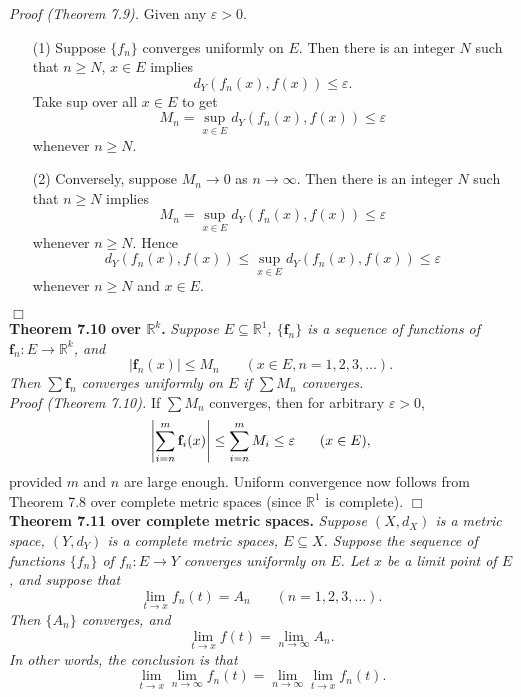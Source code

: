 \documentclass{article}
\begin{document}
\emph{Proof (Theorem 7.9).}
Given any $\varepsilon > 0$.
\begin{enumerate}
  \item[(1)]
  Suppose $\{f_n\}$ converges uniformly on $E$.
  Then there is an integer $N$ such that $n \geq N$, $x \in E$ implies
  \[
    d_Y(f_n(x),f(x)) \leq \varepsilon.
  \]
  Take sup over all $x \in E$ to get
  \[
    M_n = \sup_{x \in E} d_Y(f_n(x),f(x)) \leq \varepsilon
  \]
  whenever $n \geq N$.

  \item[(2)]
  Conversely, suppose $M_n \to 0$ as $n \to \infty$.
  Then there is an integer $N$ such that $n \geq N$ implies
  \[
    M_n = \sup_{x \in E} d_Y(f_n(x),f(x)) \leq \varepsilon
  \]
  whenever $n \geq N$.
  Hence
  \[
    d_Y(f_n(x),f(x)) \leq \sup_{x \in E} d_Y(f_n(x),f(x)) \leq \varepsilon
  \]
  whenever $n \geq N$ and $x \in E$.
\end{enumerate}
$\Box$ \\



\textbf{Theorem 7.10 over $\mathbb{R}^k$.}
\emph{Suppose $E \subseteq \mathbb{R}^1$,
$\{\mathbf{f}_n\}$ is a sequence of functions of $\mathbf{f}_n: E \to \mathbb{R}^k$,
and
\[
  |\mathbf{f}_n(x)| \leq M_n
  \:\:\:\:\:\:\:\:
  (x \in E, n = 1,2,3,\ldots).
\]
Then $\sum \mathbf{f}_n$ converges uniformly on $E$ if $\sum M_n$ converges.} \\

\emph{Proof (Theorem 7.10).}
If $\sum M_n$ converges, then for arbitrary $\varepsilon > 0$,
\[
  \abs{\sum_{i=n}^{m}\mathbf{f}_i(x)} \leq \sum_{i=n}^{m}M_i \leq \varepsilon
  \:\:\:\:\:\:\:\:
  (x \in E),
\]
provided $m$ and $n$ are large enough.
Uniform convergence now follows from Theorem 7.8 over complete metric spaces
(since $\mathbb{R}^1$ is complete).
$\Box$ \\



\textbf{Theorem 7.11 over complete metric spaces.}
\emph{Suppose $(X,d_X)$ is a metric space,
$(Y,d_Y)$ is a complete metric spaces, $E \subseteq X$.
Suppose the sequence of functions $\{f_n\}$ of $f_n: E \to Y$
converges uniformly on $E$.
Let $x$ be a limit point of $E$, and suppose that
\[
  \lim_{t \to x} f_n(t) = A_n
  \:\:\:\:\:\:\:\:
  (n=1,2,3,\ldots).
\]
Then $\{A_n\}$ converges, and
\[
  \lim_{t \to x}f(t) = \lim_{n \to \infty} A_n.
\]
In other words, the conclusion is that}
\[
  \lim_{t \to x} \lim_{n \to \infty} f_n(t)
  = \lim_{n \to \infty} \lim_{t \to x} f_n(t).
\]
\end{document}
